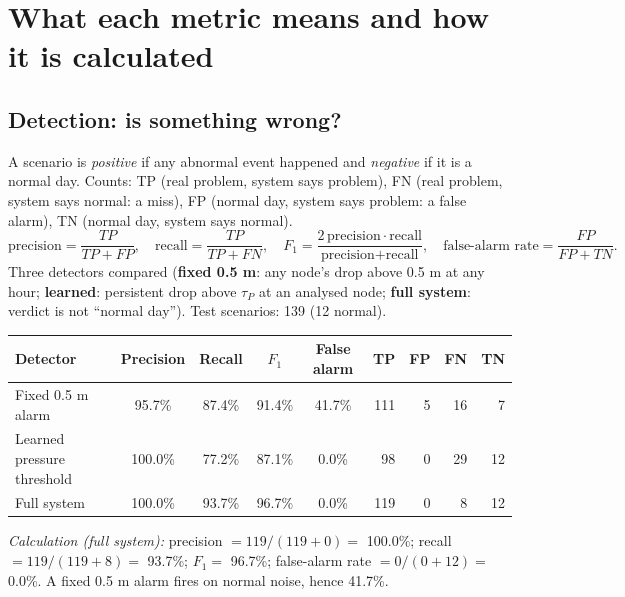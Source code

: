 \documentclass[11pt,a4paper]{article}
\begin{document}
\section{What each metric means and how it is calculated}
\subsection{Detection: is something wrong?}
A scenario is \emph{positive} if any abnormal event happened and \emph{negative} if it is a normal day. Counts: TP (real problem, system says problem), FN (real problem, system says normal: a miss), FP (normal day, system says problem: a false alarm), TN (normal day, system says normal).
\[\text{precision}=\frac{TP}{TP+FP},\quad \text{recall}=\frac{TP}{TP+FN},\quad F_1=\frac{2\,\text{precision}\cdot\text{recall}}{\text{precision}+\text{recall}},\quad \text{false-alarm rate}=\frac{FP}{FP+TN}.\]
Three detectors compared (\textbf{fixed 0.5 m}: any node's drop above 0.5 m at any hour; \textbf{learned}: persistent drop above $\tau_P$ at an analysed node; \textbf{full system}: verdict is not ``normal day''). Test scenarios: 139 (12 normal).
\begin{center}\small\begin{tabular}{@{}lccccrrrr@{}}\toprule
Detector & Precision & Recall & $F_1$ & False alarm & TP & FP & FN & TN \\\midrule
Fixed 0.5 m alarm & 95.7\% & 87.4\% & 91.4\% & 41.7\% & 111 & 5 & 16 & 7 \\
Learned pressure threshold & 100.0\% & 77.2\% & 87.1\% & 0.0\% & 98 & 0 & 29 & 12 \\
Full system & 100.0\% & 93.7\% & 96.7\% & 0.0\% & 119 & 0 & 8 & 12 \\
\bottomrule\end{tabular}\end{center}
\textit{Calculation (full system):} precision $=119/(119+0)=$ 100.0\%; recall $=119/(119+8)=$ 93.7\%; $F_1=$ 96.7\%; false-alarm rate $=0/(0+12)=$ 0.0\%. A fixed 0.5 m alarm fires on normal noise, hence 41.7\%.
\end{document}

